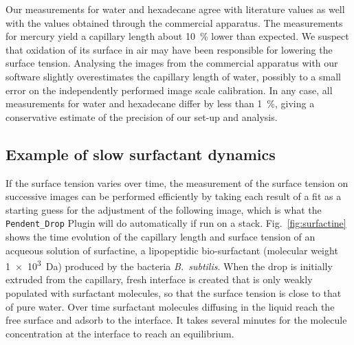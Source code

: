 \documentclass[fleqn]{scrartcl}
\newcommand{\gouttependante}{\texttt{Pendent\_Drop}\xspace}
\begin{document}
Our measurements for water and hexadecane agree with literature values
as well with the values obtained through the commercial apparatus. The
measurements for mercury yield a capillary length about
\SI{10}{\percent} lower than expected. We suspect that oxidation of
its surface in air may have been responsible for lowering the surface
tension. Analysing the images from the commercial apparatus with our
software slightly overestimates the capillary length of water,
possibly to a small error on the independently performed image scale
calibration. In any case, all measurements for water and hexadecane
differ by less than \SI{1}{\percent}, giving a conservative estimate
of the precision of our set-up and analysis.

\subsection{Example of slow surfactant dynamics}

If the surface tension varies over time, the measurement of the
surface tension on successive images can be performed efficiently by
taking each result of a fit as a starting guess for the adjustment of
the following image, which is what the \gouttependante Plugin will do
automatically if run on a stack. Fig.~\ref{fig:surfactine} shows the
time evolution of the capillary length and surface tension of an
acqueous solution of surfactine, a lipopeptidic bio-surfactant
(molecular weight \SI{1e3}{\dalton}) produced by the bacteria
\textit{B.~subtilis}. When the drop is initially extruded from the
capillary, fresh interface is created that is only weakly populated
with surfactant molecules, so that the surface tension is close to
that of pure water. Over time surfactant molecules diffusing in the
liquid reach the free surface and adsorb to the interface. It takes
several minutes for the molecule concentration at the interface to
reach an equilibrium.
\end{document}
